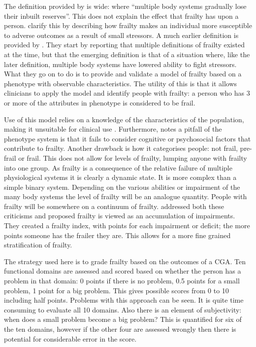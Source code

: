 \documentclass
[
	12pt,
	a4paper,
	oneside,
]{report}
\begin{document}
The definition provided by \textcite{bgs:14} is wide: where ``multiple body 
systems gradually lose
their inbuilt reserves''. This does not explain the effect that frailty has upon
a person. \textcite{clegg:13} clarify this by describing how frailty makes an
individual more susceptible to adverse outcomes as a result of small stressors.
A much earlier definition is provided by \textcite{fried:01}. They
start by reporting that multiple definitions of frailty existed at the time, 
but that the emerging definition is that of a situation where, like the later
definition, multiple body systems have lowered ability to fight stressors. What
they go on to do is to provide and validate a model of frailty based on a phenotype
with observable characteristics. The utility of this is that it allows 
clinicians to apply the model and identify people with frailty: a person who has
3 or more of the attributes in phenotype is considered to be frail. 

Use of this model relies on a knowledge of the characteristics of the population,
making it unsuitable for clinical use \parencite{ensrud:08}.
Furthermore, \textcite{martin:08} notes a pitfall of the phenotype system is 
that it fails to
consider cognitive or psychosocial factors that contribute to frailty.
Another drawback is how it categorises people: not frail,
pre-frail or frail. This does not allow for levels of frailty, lumping anyone with
frailty into one group. As frailty is a consequence of the relative failure of
multiple physiological systems it is clearly a dynamic state. It is more complex
than a simple binary system. Depending on the various abilities or impairment of
the many body systems the level of frailty will be an analogue quantity. People
with frailty will be somewhere on a continuum of frailty. \textcite{jones:05} 
addressed both these criticisms and proposed frailty is viewed as an accumulation of
impairments. They created a frailty index, with points for each impairment or
deficit; the more points someone has the frailer they are. This allows for a more 
fine grained stratification of frailty.

The strategy used here is to grade frailty based on the outcomes of a CGA. Ten
functional domains are assessed and scored based on whether the person has a
problem in that domain: 0 points if there is no problem, 0.5 points for a small
problem, 1 point for a big problem. This gives possible scores from 0 to 10 
including half points. Problems with this approach can be seen. It is quite
time consuming to evaluate all 10 domains. Also there is an element of 
subjectivity: when does a small problem become a big problem? This is quantified
for six of the ten domains, however if the other four are assessed
wrongly then there is potential for considerable error in the score. 
\end{document}
